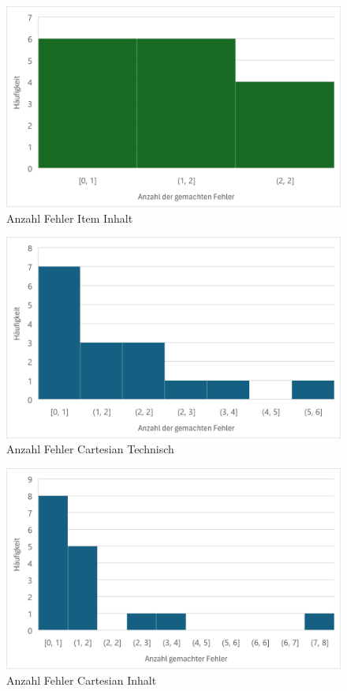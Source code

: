 \begin{figure}[tbh]
 \centering
\includegraphics{images/Results/Histogramm-Anzahl-Fehler-inhalt-item.png}
 \caption{Anzahl Fehler Item Inhalt}
 \label{fig:anzahlFehlerItemInhalt}
\end{figure}

\begin{figure}[tbh]
 \centering
\includegraphics{images/Results/Histogramm-Anzahl-Fehler-technisch-cartesian.png}
 \caption{Anzahl Fehler Cartesian Technisch}
 \label{fig:anzahlFehlerCartesianTechnisch}
\end{figure}

\begin{figure}[tbh]
 \centering
\includegraphics{images/Results/Histogramm-Anzahl-Fehler-inhalt-cartesian.png}
 \caption{Anzahl Fehler Cartesian Inhalt}
 \label{fig:anzahlFehlerCartesianInhalt}
\end{figure}

